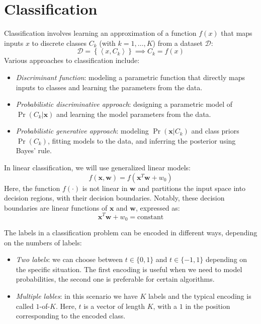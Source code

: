 \section{Classification}

Classification involves learning an approximation of a function $f(x)$ that maps inputs $x$ to discrete classes $C_k$ (with $k=1,\dots,K$) from a dataset $\mathcal{D}$: 
\[\mathcal{D}=\left\{ \left\langle x,C_k \right\rangle \right\} \implies C_k=f(x)\]
Various approaches to classification include:
\begin{itemize}
    \item \textit{Discriminant function}: modeling a parametric function that directly maps inputs to classes and learning the parameters from the data.
    \item \textit{Probabilistic discriminative approach}: designing a parametric model of $\Pr(C_k|\textbf{x})$ and learning the model parameters from the data.
    \item \textit{Probabilistic generative approach}: modeling $\Pr(\textbf{x}|C_k)$ and class priors $\Pr(C_k)$, fitting models to the data, and inferring the posterior using Bayes' rule.
\end{itemize}
In linear classification, we will use generalized linear models: 
\[f(\textbf{x},\textbf{w})=f(\textbf{x}^T\textbf{w}+w_0)\]
Here, the function $f(\cdot)$ is not linear in $\textbf{w}$ and partitions the input space into decision regions, with their decision boundaries.
Notably, these decision boundaries are linear functions of $\textbf{x}$ and $\textbf{w}$, expressed as:
\[\textbf{x}^T\textbf{w}+w_0=\text{constant}\]

The labels in a classification problem can be encoded in different ways, depending on the numbers of labels: 
\begin{itemize}
    \item \textit{Two labels}: we can choose between $t \in \{0,1\}$ and $t \in \{-1,1\}$ depending on the specific situation. 
        The first encoding is useful when we need to model probabilities, the second one is preferable for certain algorithms. 
    \item \textit{Multiple lables}: in this scenario we have $K$ labels and the typical encoding is called $1$-of-$K$. 
        Here, $t$ is a vector of length $K$, with a $1$  in the position corresponding to the encoded class.
\end{itemize}


